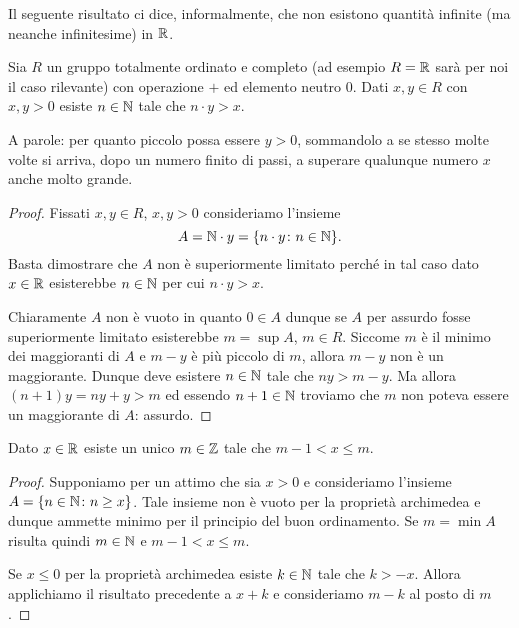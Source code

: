 Il seguente risultato ci dice, informalmente, che non 
esistono quantità infinite (ma neanche infinitesime) in ${\mathbb R}$.
%
\begin{theorem}
\label{th:archimede}%
\mymark{**}%
%
%
  Sia $R$ un gruppo totalmente ordinato e completo
  (ad esempio $R={\mathbb R}$ sarà per noi il caso rilevante)
  con operazione $+$ ed elemento neutro $0$.
  Dati $x,y\in R$ con $x,y>0$ esiste $n\in {\mathbb N}$ 
  tale che $n \cdot y > x$.

  A parole: per quanto piccolo possa essere $y>0$, 
  sommandolo a se stesso molte volte si arriva, 
  dopo un numero finito di passi, a superare 
  qualunque numero $x$ anche molto grande.
\end{theorem}
%
\begin{proof}
\mymark{*}
  Fissati $x,y\in R$, $x,y>0$ consideriamo l'insieme 
  \[
     A = {\mathbb N} \cdot y = {\left\{ n\cdot y\colon n\in {\mathbb N} \right\}}.
  \]
  Basta dimostrare che $A$ non è superiormente limitato perché 
  in tal caso dato $x\in {\mathbb R}$ esisterebbe $n\in {\mathbb N}$ per cui $n\cdot y> x$.

  Chiaramente $A$ non è vuoto in quanto $0\in A$ dunque se $A$ 
  per assurdo fosse superiormente limitato esisterebbe 
  $m=\sup A$, $m\in R$. 
  Siccome $m$ è il minimo dei maggioranti di $A$
  e $m-y$ è più piccolo di $m$, allora $m-y$ non è un maggiorante. 
  Dunque deve esistere $n\in {\mathbb N}$ tale che $ny>m-y$.
  Ma allora $(n+1)y = ny + y > m$ ed essendo $n+1\in {\mathbb N}$ troviamo che $m$
  non poteva essere un maggiorante di $A$: assurdo.
\end{proof}

\begin{theorem}
\mymark{*}%
  Dato $x\in {\mathbb R}$ esiste un unico $m\in {\mathbb Z}$ tale che $m-1 < x \le m$.
\end{theorem}
%
\begin{proof}
  Supponiamo per un attimo che sia $x > 0$
  e consideriamo l'insieme $A={\left\{ n \in {\mathbb N} \colon n\ge x \right\}}$.
  Tale insieme non è vuoto per la proprietà archimedea 
  e dunque ammette minimo per il principio del buon ordinamento.
  Se $m=\min A$ risulta quindi $m\in {\mathbb N}$ e $m-1< x \le m$.

  Se $x\le 0$ per la proprietà archimedea esiste $k\in {\mathbb N}$ tale che 
  $k>-x$. Allora applichiamo il risultato precedente a $x+k$ e consideriamo 
  $m-k$ al posto di $m$.
\end{proof}

